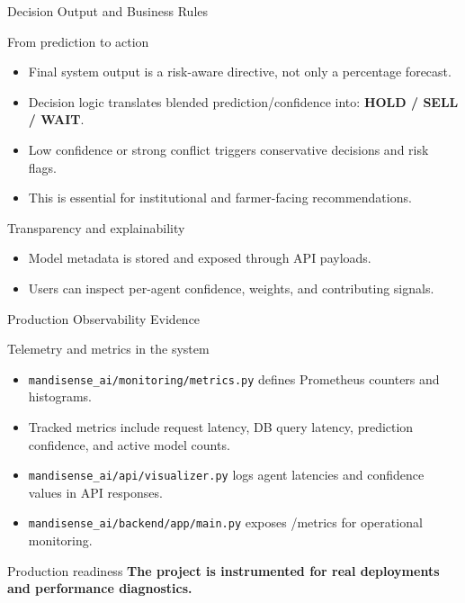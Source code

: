 \documentclass{beamer}
\begin{document}
\begin{frame}{Decision Output and Business Rules}
\begin{orangecard}{From prediction to action}
  \begin{itemize}
    \item Final system output is a risk-aware directive, not only a percentage forecast.
    \item Decision logic translates blended prediction/confidence into: \textbf{HOLD / SELL / WAIT}.
    \item Low confidence or strong conflict triggers conservative decisions and risk flags.
    \item This is essential for institutional and farmer-facing recommendations.
  \end{itemize}
\end{orangecard}

\vspace{6pt}
\begin{purplecard}{Transparency and explainability}
  \begin{itemize}
    \item Model metadata is stored and exposed through API payloads.
    \item Users can inspect per-agent confidence, weights, and contributing signals.
  \end{itemize}
\end{purplecard}
\end{frame}

\begin{frame}{Production Observability Evidence}
\begin{infocard}{Telemetry and metrics in the system}
  \begin{itemize}
    \item \texttt{mandisense\_ai/monitoring/metrics.py} defines Prometheus counters and histograms.
    \item Tracked metrics include request latency, DB query latency, prediction confidence, and active model counts.
    \item \texttt{mandisense\_ai/api/visualizer.py} logs agent latencies and confidence values in API responses.
    \item \texttt{mandisense\_ai/backend/app/main.py} exposes /metrics for operational monitoring.
  \end{itemize}
\end{infocard}

\begin{successcard}{Production readiness}
  \textbf{The project is instrumented for real deployments and performance diagnostics.}
\end{successcard}
\end{frame}
\end{document}
